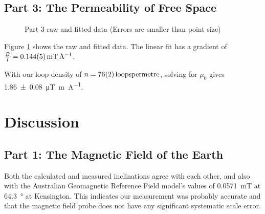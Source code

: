 \documentclass[a4paper]{scrartcl}
\begin{document}
\subsection{Part 3: The Permeability of Free Space}
\begin{figure}
    \centering
    \caption{Part 3 raw and fitted data (Errors are smaller than point size)}
    \label{tab:part3_graph}
\end{figure}

Figure \ref{tab:part3_graph} shows the raw and fitted data. The linear fit has a gradient of \(\frac{B}{I} = \SI{0.144 \pm 0.005}{\milli\tesla\per\ampere}\).

With our loop density of \(n = \SI{76 \pm 2}{loops per metre}\), solving for \(\mu_0\) gives \SI{1.86 \pm 0.08}{\micro\tesla\metre\per\ampere}.

\section{Discussion}
\subsection{Part 1: The Magnetic Field of the Earth}
Both the calculated and measured inclinations agree with each other, and also with the Australian Geomagnetic Reference Field model's values of \SI{0.0571}{\milli\tesla} at \SI{64.3}{\degree} at Kensington. This indicates our measurement was probably accurate and that the magnetic field probe does not have any significant systematic scale error.
\end{document}
